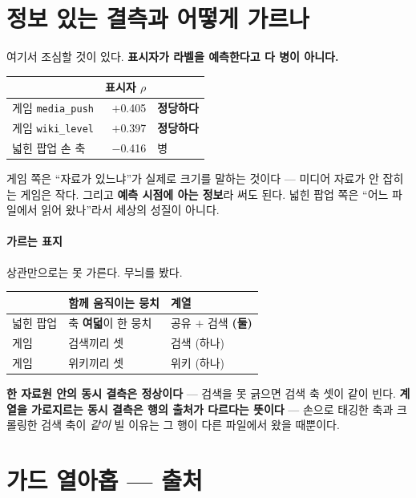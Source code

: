 \documentclass[10pt]{article}
\begin{document}
\section{정보 있는 결측과 어떻게 가르나}

여기서 조심할 것이 있다. \textbf{표시자가 라벨을 예측한다고 다 병이 아니다.}

\begin{center}\small
\begin{tabular}{lrl}
\hline
& 표시자 $\rho$ & \\
\hline
게임 \texttt{media\_push} & $+$0.405 & \textbf{정당하다} \\
게임 \texttt{wiki\_level} & $+$0.397 & \textbf{정당하다} \\
넓힌 팝업 손 축 & $-$0.416 & 병 \\
\hline
\end{tabular}
\end{center}

게임 쪽은 ``자료가 있느냐''가 실제로 크기를 말하는 것이다 --- 미디어 자료가
안 잡히는 게임은 작다. 그리고 \textbf{예측 시점에 아는 정보}라 써도 된다.
넓힌 팝업 쪽은 ``어느 파일에서 읽어 왔나''라서 세상의 성질이 아니다.

\paragraph{가르는 표지} 상관만으로는 못 가른다. 무늬를 봤다.

\begin{center}\small
\begin{tabular}{lll}
\hline
& 함께 움직이는 뭉치 & 계열 \\
\hline
넓힌 팝업 & 축 \textbf{여덟}이 한 뭉치 & 공유 $+$ 검색 \textbf{(둘)} \\
게임 & 검색끼리 셋 & 검색 (하나) \\
게임 & 위키끼리 셋 & 위키 (하나) \\
\hline
\end{tabular}
\end{center}

\textbf{한 자료원 안의 동시 결측은 정상이다} --- 검색을 못 긁으면 검색 축
셋이 같이 빈다. \textbf{계열을 가로지르는 동시 결측은 행의 출처가 다르다는
뜻이다} --- 손으로 태깅한 축과 크롤링한 검색 축이 \emph{같이} 빌 이유는
그 행이 다른 파일에서 왔을 때뿐이다.

\section{가드 열아홉 --- 출처}
\end{document}
